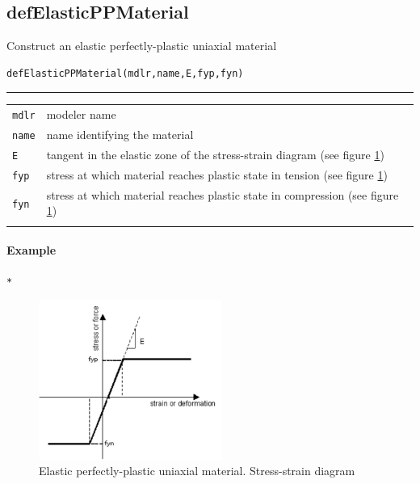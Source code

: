 \subsection{defElasticPPMaterial}
\noindent Construct an elastic perfectly-plastic uniaxial material
\begin{verbatim}
defElasticPPMaterial(mdlr,name,E,fyp,fyn)
\end{verbatim}
\vspace{-10pt}
{\color{grayLines} \rule{\linewidth}{0.25pt}}
\begin{center}
\begin{tabular}{lp{10cm}}
{\tt mdlr} & modeler name \\
{\tt name} & name identifying the material \\
{\tt E} & tangent in the elastic zone of the stress-strain diagram (see figure \ref{ElasticPP}) \\
{\tt fyp} & stress at which material reaches plastic state in tension (see figure \ref{ElasticPP}) \\
{\tt fyn} &  stress at which material reaches plastic state in compression (see figure \ref{ElasticPP}) \\
{\tt } &  \\
\end{tabular}
\end{center}
\paragraph{Example}
\begin{verbatim}
*
\end{verbatim}

\begin{figure}[h]
\centering
\includegraphics[width=60mm]{materials/figures/ElasticPP}
\caption{Elastic perfectly-plastic uniaxial material. Stress-strain diagram}\label{ElasticPP}
\end{figure}

